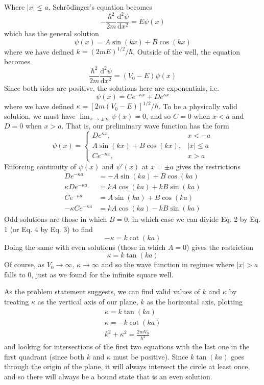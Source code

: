 \documentclass[../principles-of-quantum-mechanics.tex]{subfiles}
\begin{document}
\begin{questions}
	\begin{solution}
		Where $|x| \leq a$, Schr\"odinger's equation becomes
		$$-\frac{\hbar^2}{2m}\frac{\mathrm{d}^2\psi}{\mathrm{d}x^2} = E\psi(x)$$
		which has the general solution
		$$\psi(x) = A\sin(kx) + B\cos(kx)$$
		where we have defined $k = (2mE)^{1/2}/\hbar$. Outside of the well, the equation becomes
		$$\frac{\hbar^2}{2m}\frac{\mathrm{d}^2\psi}{\mathrm{d}x^2} = (V_0 - E)\psi(x)$$
		Since both sides are positive, the solutions here are exponentials, i.e.
		$$\psi(x) = Ce^{-\kappa x} + De^{\kappa x}$$
		where we have defined $\kappa = [2m(V_0-E)]^{1/2}/\hbar$. To be a physically valid solution, we must have $\lim_{x\to\pm\infty}\psi(x) = 0$, and so $C = 0$ when $x < a$ and $D = 0$ when $x > a$. That is, our preliminary wave function has the form
		$$\psi(x) = \begin{cases}De^{\kappa x}, &x < -a \\ A\sin(kx) + B\cos(kx), &|x| \leq a \\ Ce^{-\kappa x}, &x > a\end{cases}$$
		Enforcing continuity of $\psi(x)$ and $\psi'(x)$ at $x = \pm a$ gives the restrictions
		\begin{align*}
			De^{-\kappa a} &= -A\sin(ka) + B\cos(ka) \\
			\kappa De^{-\kappa a} &= kA\cos(ka) + kB\sin(ka) \\
			Ce^{-\kappa a} &= A\sin(ka) + B\cos(ka) \\
			-\kappa Ce^{-\kappa a} &= kA\cos(ka) - kB\sin(ka)
		\end{align*}
		Odd solutions are those in which $B = 0$, in which case we can divide Eq. 2 by Eq. 1 (or Eq. 4 by Eq. 3) to find
		$$-\kappa = k\cot(ka)$$
		Doing the same with even solutions (those in which $A = 0$) gives the restriction
		$$\kappa = k\tan(ka)$$
		Of course, as $V_0\to\infty$, $\kappa\to\infty$ and so the wave function in regimes where $|x| > a$ falls to $0$, just as we found for the infinite square well.
		
		As the problem statement suggests, we can find valid values of $k$ and $\kappa$ by treating $\kappa$ as the vertical axis of our plane, $k$ as the horizontal axis, plotting
		\begin{gather*}
			\kappa = k\tan(ka) \\
			\kappa = -k\cot(ka) \\
			k^2 + \kappa^2 = \frac{2mV_0}{\hbar^2}
		\end{gather*}
		and looking for intersections of the first two equations with the last one in the first quadrant (since both $k$ and $\kappa$ must be positive). Since $k\tan(ka)$ goes through the origin of the plane, it will always intersect the circle at least once, and so there will always be a bound state that is an even solution.
		

\end{solution}
\end{questions}
\end{document}
